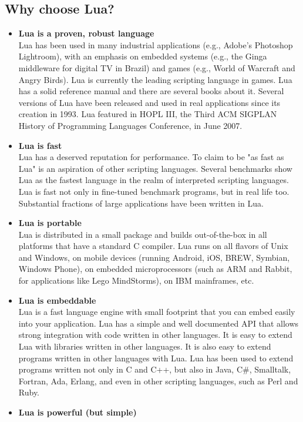 \subsection{Why choose Lua?}
\begin{itemize}
\item \textbf{Lua is a proven, robust language}\\
Lua has been used in many industrial applications (e.g., Adobe's Photoshop Lightroom), with an emphasis on embedded systems (e.g., the Ginga middleware for digital TV in Brazil) and games (e.g., World of Warcraft and Angry Birds). Lua is currently the leading scripting language in games. Lua has a solid reference manual and there are several books about it. Several versions of Lua have been released and used in real applications since its creation in 1993. Lua featured in HOPL III, the Third ACM SIGPLAN History of Programming Languages Conference, in June 2007. 
\item \textbf{Lua is fast}\\
Lua has a deserved reputation for performance. To claim to be "as fast as Lua" is an aspiration of other scripting languages. Several benchmarks show Lua as the fastest language in the realm of interpreted scripting languages. Lua is fast not only in fine-tuned benchmark programs, but in real life too. Substantial fractions of large applications have been written in Lua. 
\item \textbf{Lua is portable}\\
Lua is distributed in a small package and builds out-of-the-box in all platforms that have a standard C compiler. Lua runs on all flavors of Unix and Windows, on mobile devices (running Android, iOS, BREW, Symbian, Windows Phone), on embedded microprocessors (such as ARM and Rabbit, for applications like Lego MindStorms), on IBM mainframes, etc. 
\item \textbf{Lua is embeddable}\\
 Lua is a fast language engine with small footprint that you can embed easily into your application. Lua has a simple and well documented API that allows strong integration with code written in other languages. It is easy to extend Lua with libraries written in other languages. It is also easy to extend programs written in other languages with Lua. Lua has been used to extend programs written not only in C and C++, but also in Java, C\#, Smalltalk, Fortran, Ada, Erlang, and even in other scripting languages, such as Perl and Ruby. 
\item \textbf{Lua is powerful (but simple)}\\

\end{itemize}
